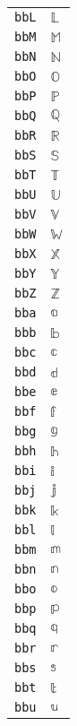 \begin{longtable}{ll}
\texttt{bbL}&${}{\mathbb{L}}{}$\\
\texttt{bbM}&${}{\mathbb{M}}{}$\\
\texttt{bbN}&${}{\mathbb{N}}{}$\\
\texttt{bbO}&${}{\mathbb{O}}{}$\\
\texttt{bbP}&${}{\mathbb{P}}{}$\\
\texttt{bbQ}&${}{\mathbb{Q}}{}$\\
\texttt{bbR}&${}{\mathbb{R}}{}$\\
\texttt{bbS}&${}{\mathbb{S}}{}$\\
\texttt{bbT}&${}{\mathbb{T}}{}$\\
\texttt{bbU}&${}{\mathbb{U}}{}$\\
\texttt{bbV}&${}{\mathbb{V}}{}$\\
\texttt{bbW}&${}{\mathbb{W}}{}$\\
\texttt{bbX}&${}{\mathbb{X}}{}$\\
\texttt{bbY}&${}{\mathbb{Y}}{}$\\
\texttt{bbZ}&${}{\mathbb{Z}}{}$\\
\texttt{bba}&${}{\mathbb{a}}{}$\\
\texttt{bbb}&${}{\mathbb{b}}{}$\\
\texttt{bbc}&${}{\mathbb{c}}{}$\\
\texttt{bbd}&${}{\mathbb{d}}{}$\\
\texttt{bbe}&${}{\mathbb{e}}{}$\\
\texttt{bbf}&${}{\mathbb{f}}{}$\\
\texttt{bbg}&${}{\mathbb{g}}{}$\\
\texttt{bbh}&${}{\mathbb{h}}{}$\\
\texttt{bbi}&${}{\mathbb{i}}{}$\\
\texttt{bbj}&${}{\mathbb{j}}{}$\\
\texttt{bbk}&${}{\mathbb{k}}{}$\\
\texttt{bbl}&${}{\mathbb{l}}{}$\\
\texttt{bbm}&${}{\mathbb{m}}{}$\\
\texttt{bbn}&${}{\mathbb{n}}{}$\\
\texttt{bbo}&${}{\mathbb{o}}{}$\\
\texttt{bbp}&${}{\mathbb{p}}{}$\\
\texttt{bbq}&${}{\mathbb{q}}{}$\\
\texttt{bbr}&${}{\mathbb{r}}{}$\\
\texttt{bbs}&${}{\mathbb{s}}{}$\\
\texttt{bbt}&${}{\mathbb{t}}{}$\\
\texttt{bbu}&${}{\mathbb{u}}{}$\\

\end{longtable}
